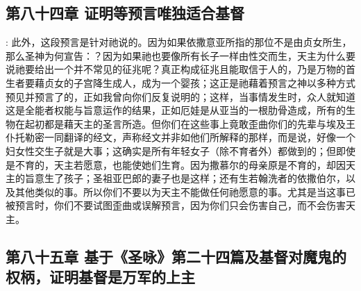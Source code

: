 
\subsection{第八十四章 证明等预言唯独适合基督}

: 此外，这段预言是针对祂说的。因为如果依撒意亚所指的那位不是由贞女所生，那么圣神为何宣告：？因为如果祂也要像所有长子一样由性交而生，天主为什么要说祂要给出一个并不常见的征兆呢？真正构成征兆且能取信于人的，乃是万物的首生者要藉贞女的子宫降生成人，成为一个婴孩；这正是祂藉着预言之神以多种方式预见并预言了的，正如我曾向你们反复说明的；这样，当事情发生时，众人就知道这是全能者权能与旨意运作的结果，正如厄娃是从亚当的一根肋骨造成，所有的生物在起初都是藉天主的圣言所造。但你们在这些事上竟敢歪曲你们的先辈与埃及王仆托勒密一同翻译的经文，声称经文并非如他们所解释的那样，而是说，好像一个妇女性交生子就是大事；这确实是所有年轻女子（除不育者外）都做到的；但即使是不育的，天主若愿意，也能使她们生育。因为撒慕尔的母亲原是不育的，却因天主的旨意生了孩子；圣祖亚巴郎的妻子也是这样；还有生若翰洗者的依撒伯尔，以及其他类似的事。所以你们不要以为天主不能做任何祂愿意的事。尤其是当这事已被预言时，你们不要试图歪曲或误解预言，因为你们只会伤害自己，而不会伤害天主。\par


\subsection{第八十五章 基于《圣咏》第二十四篇及基督对魔鬼的权柄，证明基督是万军的上主}

